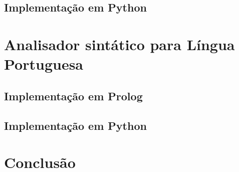 \documentclass[12pt,a4paper]{report}
\begin{document}
\subsection{Implementação em Python}
\section{Analisador sintático para Língua Portuguesa}
\subsection{Implementação em Prolog}
\subsection{Implementação em Python}
\section{Conclusão}
\end{document}

